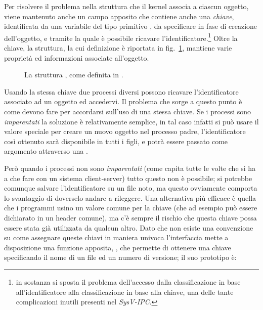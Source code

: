 Per risolvere il problema nella struttura  che il kernel
associa a ciascun oggetto, viene mantenuto anche un campo apposito che
contiene anche una \textsl{chiave}, identificata da una variabile del tipo
primitivo , da specificare in fase di creazione dell'oggetto, e
tramite la quale è possibile ricavare l'identificatore.\footnote{in sostanza
  si sposta il problema dell'accesso dalla classificazione in base
  all'identificatore alla classificazione in base alla chiave, una delle tante
  complicazioni inutili presenti nel \textit{SysV-IPC}.} Oltre la chiave, la
struttura, la cui definizione è riportata in fig.~\ref{fig:ipc_ipc_perm},
mantiene varie proprietà ed informazioni associate all'oggetto.

\begin{figure}[!htb]
  \footnotesize \centering
  \begin{minipage}[c]{0.80\textwidth}
  \end{minipage} 
  \normalsize 
  \caption{La struttura , come definita in
    .}
  \label{fig:ipc_ipc_perm}
\end{figure}

Usando la stessa chiave due processi diversi possono ricavare l'identificatore
associato ad un oggetto ed accedervi. Il problema che sorge a questo punto è
come devono fare per accordarsi sull'uso di una stessa chiave. Se i processi
sono \textsl{imparentati} la soluzione è relativamente semplice, in tal caso
infatti si può usare il valore speciale  per creare un
nuovo oggetto nel processo padre, l'identificatore così ottenuto sarà
disponibile in tutti i figli, e potrà essere passato come argomento attraverso
una .

Però quando i processi non sono \textsl{imparentati} (come capita tutte le
volte che si ha a che fare con un sistema client-server) tutto questo non è
possibile; si potrebbe comunque salvare l'identificatore su un file noto, ma
questo ovviamente comporta lo svantaggio di doverselo andare a rileggere.  Una
alternativa più efficace è quella che i programmi usino un valore comune per
la chiave (che ad esempio può essere dichiarato in un header comune), ma c'è
sempre il rischio che questa chiave possa essere stata già utilizzata da
qualcun altro.  Dato che non esiste una convenzione su come assegnare queste
chiavi in maniera univoca l'interfaccia mette a disposizione una funzione
apposita, , che permette di ottenere una chiave specificando il
nome di un file ed un numero di versione; il suo prototipo è:

